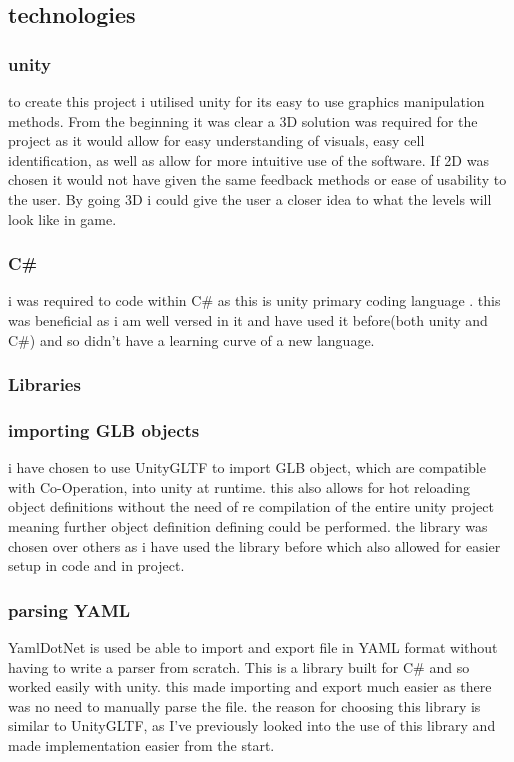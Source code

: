 

\subsection{technologies}
\subsubsection{unity}
to create this project i utilised unity for its easy to use graphics manipulation methods. From the beginning it was clear a 3D solution was required for the project as it would allow for easy understanding of visuals, easy cell identification, as well as allow for more intuitive use of the software. If 2D was chosen it would not have given the same feedback methods or ease of usability to the user. By going 3D i could give the user a closer idea to what the levels will look like in game.
\subsubsection{C\#}
i was required to code within C\# as this is unity primary coding language . this was beneficial as i am well versed in it and have used it before(both unity and C\#) and so didn't have a learning curve of a new language.

\subsubsection{Libraries}
\subsubsection*{importing GLB objects}
i have chosen to use UnityGLTF\cite{siccity_2021_github} to import GLB object, which are compatible with Co-Operation, into unity at runtime. this also allows for hot reloading object definitions without the need of re compilation of the entire unity project meaning further object definition defining could be performed. the library was chosen over others as i have used the library before which also allowed for easier setup in code and in project.\\
\subsubsection*{parsing YAML}
YamlDotNet\cite{aubry_2024_aaubryyamldotnet} is used be able to import and export file in YAML format without having to write a parser from scratch. This is a library built for C\# and so worked easily with unity. this made importing and export much easier as there was no need to manually parse the file. the reason for choosing this library is similar to UnityGLTF, as I've previously looked into the use of this library and made implementation easier from the start.\\

